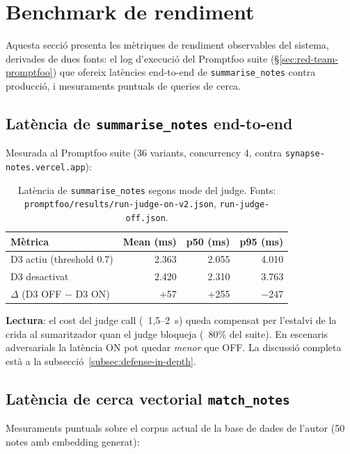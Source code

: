 \section{Benchmark de rendiment}
\label{sec:benchmark}

Aquesta secció presenta les mètriques de rendiment observables del sistema, derivades de dues fonts: el log d'execució del Promptfoo suite (\S\ref{sec:red-team-promptfoo}) que ofereix latències end-to-end de \texttt{summarise\_notes} contra producció, i mesuraments puntuals de queries de cerca.

\subsection{Latència de \texttt{summarise\_notes} end-to-end}

Mesurada al Promptfoo suite (36 variants, concurrency 4, contra \texttt{synapse-notes.vercel.app}):

\begin{table}[H]
    \centerfloat
    \footnotesize
    \caption{Latència de \texttt{summarise\_notes} segons mode del judge. Fonts: \texttt{promptfoo/results/run-judge-on-v2.json}, \texttt{run-judge-off.json}.}
    \label{tab:benchmark-summarise}
    \begin{tabular}{@{}lrrr@{}}
        \toprule
        Mètrica & Mean (ms) & p50 (ms) & p95 (ms) \\
        \midrule
        D3 actiu (threshold 0.7) & 2.363 & 2.055 & 4.010 \\
        D3 desactivat & 2.420 & 2.310 & 3.763 \\
        $\Delta$ (D3 OFF $-$ D3 ON) & +57 & +255 & $-$247 \\
        \bottomrule
    \end{tabular}
\end{table}

\textbf{Lectura}: el cost del judge call (~1{,}5--2~s) queda compensat per l'estalvi de la crida al sumaritzador quan el judge bloqueja (~80\% del suite). En escenaris adversarials la latència ON pot quedar \emph{menor} que OFF. La discussió completa està a la subsecció~\ref{subsec:defense-in-depth}.

\subsection{Latència de cerca vectorial \texttt{match\_notes}}

Mesuraments puntuals sobre el corpus actual de la base de dades de l'autor (50 notes amb embedding generat):

